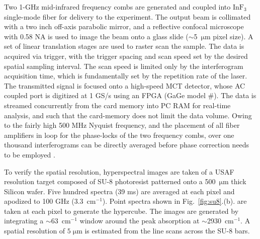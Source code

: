 \documentclass{optica-article}
\begin{document}
Two 1-GHz mid-infrared frequency combs are generated and coupled into $\mathrm{InF_3}$ single-mode fiber for delivery to the experiment. The output beam is collimated with a two inch off-axis parabolic mirror, and a reflective confocal microscope with 0.58 NA is used to image the beam onto a glass slide (\mbox{$\sim$5 $\mathrm{\mu m}$} pixel size). A set of linear translation stages are used to raster scan the sample. The data is acquired via trigger, with the trigger spacing and scan speed set by the desired spatial sampling interval. The scan speed is limited only by the interferogram acquisition time, which is fundamentally set by the repetition rate of the laser. The transmitted signal is focused onto a high-speed MCT detector, whose AC coupled port is digitized at 1 GS/s using an FPGA (GaGe model \#). The data is streamed concurrently from the card memory into PC RAM for real-time analysis, and such that the card-memory does not limit the data volume. Owing to the fairly high 500 MHz Nyquist frequency, and the placement of all fiber amplifiers in loop for the phase-locks of the two frequency combs, over one thousand interferograms can be directly averaged before phase correction needs to be employed \cite{hebertSelfcorrectedChipbasedDualcomb2017,hebertSelfCorrectionLimitsDualComb2019}.

To verify the spatial resolution, hyperspectral images are taken of a USAF resolution target composed of SU-8 photoresist patterned onto a \mbox{500 $\mathrm{\mu m}$} thick Silicon wafer. Five hundred spectra (39 ms) are averaged at each pixel and apodized to 100 GHz (\mbox{3.3 $\mathrm{cm^{-1}}$}). Point spectra shown in \mbox{Fig. \ref{fig:su8}.(b).} are taken at each pixel to generate the hypercube. The images are generated by integrating a \mbox{$\sim$63 $\mathrm{cm^{-1}}$} window around the peak absorption at \mbox{$\sim$2930 $\mathrm{cm^{-1}}$}. A spatial resolution of \mbox{$5 \; \mathrm{\mu m}$} is estimated from the line scans across the SU-8 bars.

\end{document}
